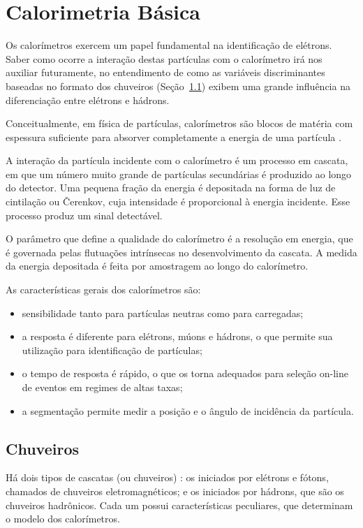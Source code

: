 \section{Calorimetria Básica}

Os calorímetros exercem um papel fundamental na identificação de elétrons. Saber como ocorre a interação destas partículas com o calorímetro irá nos auxiliar futuramente, no entendimento de como as variáveis discriminantes baseadas no formato dos chuveiros (Seção~\ref{sec:chuveiros}) exibem uma grande influência na diferenciação entre elétrons e hádrons.

Conceitualmente, em física de partículas, calorímetros são blocos de matéria com espessura suficiente para absorver completamente a energia de uma partícula \cite{wigmans2000calorimetry}.

A interação da partícula incidente com o calorímetro é um processo em cascata, em que um número muito grande de partículas secundárias é produzido ao longo do detector. Uma pequena fração da energia é depositada na forma de luz de cintilação ou Čerenkov, cuja intensidade é proporcional à energia incidente. Esse processo produz um sinal detectável.

O parâmetro que define a qualidade do calorímetro é a resolução em energia, que é governada pelas flutuações intrínsecas no desenvolvimento da cascata. A medida da energia depositada é feita por amostragem ao longo do calorímetro.

As características gerais dos calorímetros são:
\begin{itemize}
\item sensibilidade tanto para partículas neutras como para carregadas;
\item a resposta é diferente para elétrons, múons e hádrons, o que permite sua utilização para identificação de partículas;
\item o tempo de resposta é rápido, o que os torna adequados para seleção on-line de eventos em regimes de altas taxas;
\item a segmentação permite medir a posição e o ângulo de incidência da partícula.
\end{itemize}

\subsection{Chuveiros}\label{sec:chuveiros}

Há dois tipos de cascatas (ou chuveiros) \cite{wigmans2000calorimetry}: os iniciados por elétrons e fótons, chamados de chuveiros eletromagnéticos; e os iniciados por hádrons, que são os chuveiros hadrônicos. Cada um possui características peculiares, que determinam o modelo dos calorímetros.

